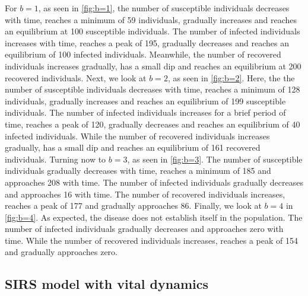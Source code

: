 \documentclass[../main.tex]{subfiles}
\begin{document}
For $b=1$, as seen in \cref{fig:b=1}, the number of susceptible individuals decreases with time, reaches a minimum of 59 individuals, gradually increases and reaches an equilibrium at 100 susceptible individuals.
The number of infected individuals increases with time, reaches a peak of 195, gradually decreases and reaches an equilibrium of 100 infected individuals. Meanwhile, the number of recovered individuals increases gradually, has a small dip and reaches an equilibrium at 200 recovered individuals. Next, we look at $b=2$, as seen in \cref{fig:b=2}. Here, the the number of susceptible individuals decreases with time, reaches a minimum of 128 individuals, gradually increases and reaches an equilibrium of 199 susceptible individuals. The number of infected individuals increases for a brief period of  time, reaches a peak of 120, gradually decreases and reaches an equilibrium of 40 infected individuals. While the number of recovered individuals increases gradually, has a small dip and reaches an equilibrium of 161 recovered individuals.
Turning now to  $b=3$, as seen in \cref{fig:b=3}. The number of susceptible individuals gradually decreases with time, reaches a minimum of 185 and approaches 208 with time. The number of infected individuals gradually decreases and approaches 16 with time. The number of recovered individuals increases, reaches a peak of 177 and gradually approaches 86.
Finally, we look at $b=4$ in \cref{fig:b=4}. As expected, the disease does not establish itself in the population. The number of infected individuals gradually decreases and approaches zero with time. While the number of recovered individuals increases, reaches a peak of 154 and gradually approaches zero. 


\subsection{SIRS model with vital dynamics}
\end{document}
